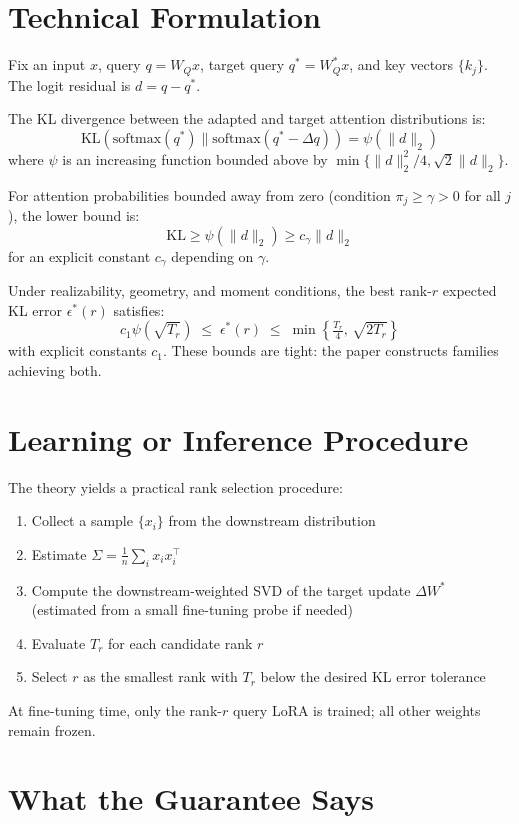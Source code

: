 \documentclass[10pt,twocolumn]{article}
\begin{document}
\section{Technical Formulation}

Fix an input $x$, query $q = W_Q x$, target query $q^* = W_Q^* x$, and
key vectors $\{k_j\}$. The logit residual is $d = q - q^*$.

The KL divergence between the adapted and target attention distributions
is:
\[
  \text{KL}(\text{softmax}(q^*) \| \text{softmax}(q^* - \Delta q))
  = \psi(\|d\|_2)
\]
where $\psi$ is an increasing function bounded above by
$\min\{\|d\|_2^2/4, \sqrt{2}\|d\|_2\}$.

For attention probabilities bounded away from zero (condition $\pi_j \geq
\gamma > 0$ for all $j$), the lower bound is:
\[
  \text{KL} \geq \psi(\|d\|_2) \geq c_\gamma \|d\|_2
\]
for an explicit constant $c_\gamma$ depending on $\gamma$.

Under realizability, geometry, and moment conditions, the best rank-$r$
expected KL error $\epsilon^*(r)$ satisfies:
\[
  c_1 \psi(\sqrt{T_r}) \;\leq\; \epsilon^*(r) \;\leq\;
  \min\!\left\{\tfrac{T_r}{4},\, \sqrt{2 T_r}\right\}
\]
with explicit constants $c_1$. These bounds are tight: the paper constructs
families achieving both.

\section{Learning or Inference Procedure}

The theory yields a practical rank selection procedure:
\begin{enumerate}[itemsep=2pt,parsep=0pt]
  \item Collect a sample $\{x_i\}$ from the downstream distribution
  \item Estimate $\Sigma = \frac{1}{n}\sum_i x_i x_i^\top$
  \item Compute the downstream-weighted SVD of the target update
    $\Delta W^*$ (estimated from a small fine-tuning probe if needed)
  \item Evaluate $T_r$ for each candidate rank $r$
  \item Select $r$ as the smallest rank with $T_r$ below the
    desired KL error tolerance
\end{enumerate}

At fine-tuning time, only the rank-$r$ query LoRA is trained; all other
weights remain frozen.

\section{What the Guarantee Says}
\end{document}
